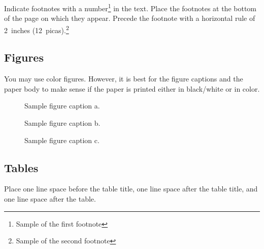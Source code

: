 \documentclass{article} %
\begin{document}
Indicate footnotes with a number\footnote{Sample of the first footnote} in the
text. Place the footnotes at the bottom of the page on which they appear.
Precede the footnote with a horizontal rule of 2~inches
(12~picas).\footnote{Sample of the second footnote}

\subsection{Figures}

You may use color figures.
However, it is best for the
figure captions and the paper body to make sense if the paper is printed
either in black/white or in color.

\begin{figure}[h]
\begin{center}
\fbox{\rule[-.5cm]{0cm}{4cm} \rule[-.5cm]{4cm}{0cm}}
\end{center}
\caption{Sample figure caption a.}
\end{figure}

\begin{figure}[h]
\begin{center}
\fbox{\rule[-.5cm]{0cm}{4cm} \rule[-.5cm]{4cm}{0cm}}
\end{center}
\caption{Sample figure caption b.}
\end{figure}

\begin{figure}[h]
\begin{center}
\fbox{\rule[-.5cm]{0cm}{4cm} \rule[-.5cm]{4cm}{0cm}}
\end{center}
\caption{Sample figure caption c.}
\end{figure}

\subsection{Tables}

Place one line space before the table title, one line space after the table
title, and one line space after the table.
\end{document}
